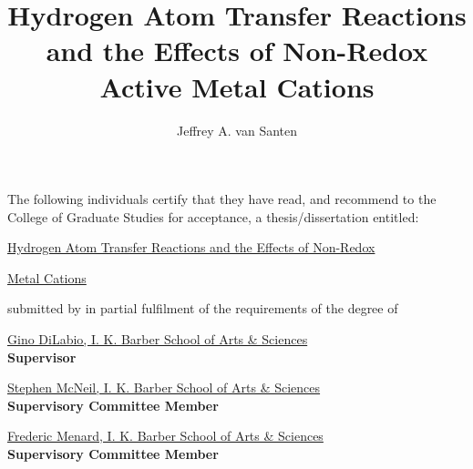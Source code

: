 \documentclass[msc,oneside]{ubcthesis}%
\title{Hydrogen Atom Transfer Reactions and the Effects of Non-Redox Active Metal Cations}
\author{Jeffrey A. van Santen} %
\begin{document}
\frontmatter                    %

\maketitle                      %

\makeatletter

The following individuals certify that they have read, and recommend to the College of Graduate Studies for acceptance, a thesis/dissertation entitled:

\vspace{2ex}

 \underline{\sc Hydrogen Atom Transfer Reactions and the Effects of Non-Redox}

 \underline{\scActive Metal Cations}

\vspace{1ex}

\noindent submitted by \underline{\sc \@author} in partial fulfilment of the requirements of the degree of \underline{\sc \@degreetitle}
\makeatother

\newlength{\linespace}
\setlength{\linespace}{.75cm} %
\vspace{2\linespace}\smaller

\noindent\underline{Gino DiLabio, I. K. Barber School of Arts \& Sciences}
\\
\textbf{Supervisor}

\vspace{\linespace}

\noindent\underline{Stephen McNeil, I. K. Barber School of Arts \& Sciences}
\\
\textbf{Supervisory Committee Member}

\vspace{\linespace}

\noindent\underline{Frederic Menard, I. K. Barber School of Arts \& Sciences}
\\
\textbf{Supervisory Committee Member}

\vspace{\linespace}
\end{document}
